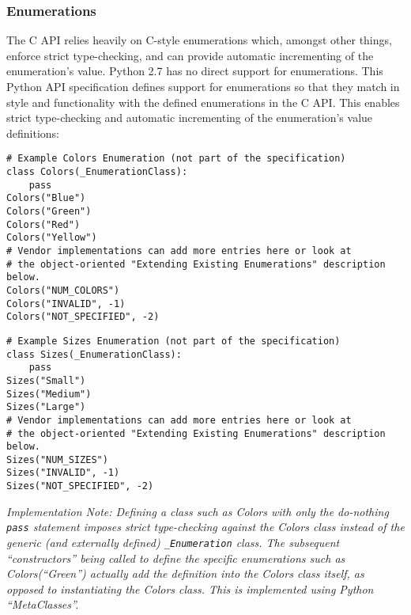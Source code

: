 \subsubsection{Enumerations}\label{sec:Enumerations}

The C API relies heavily on C-style enumerations which, amongst other things,
enforce strict type-checking, and can provide automatic incrementing of the
enumeration's value. Python 2.7 has no direct support for enumerations.  This
Python API specification defines support for enumerations so that they match in
style and functionality with the defined enumerations in the C API. This
enables strict type-checking and automatic incrementing of the enumeration's
value definitions:

\begin{center}\begin{minipage}{.95\linewidth}\begin{lstlisting}
# Example Colors Enumeration (not part of the specification)
class Colors(_EnumerationClass):
    pass
Colors("Blue")
Colors("Green")
Colors("Red")
Colors("Yellow")
# Vendor implementations can add more entries here or look at
# the object-oriented "Extending Existing Enumerations" description below.
Colors("NUM_COLORS")
Colors("INVALID", -1)
Colors("NOT_SPECIFIED", -2)
\end{lstlisting}\end{minipage}\end{center}

\begin{center}\begin{minipage}{.95\linewidth}\begin{lstlisting}
# Example Sizes Enumeration (not part of the specification)
class Sizes(_EnumerationClass):
    pass
Sizes("Small")
Sizes("Medium")
Sizes("Large")
# Vendor implementations can add more entries here or look at
# the object-oriented "Extending Existing Enumerations" description below.
Sizes("NUM_SIZES")
Sizes("INVALID", -1)
Sizes("NOT_SPECIFIED", -2)
\end{lstlisting}\end{minipage}\end{center}

\emph{Implementation Note: Defining a class such as Colors with only the
do-nothing \texttt{pass} statement imposes strict type-checking against the
Colors class instead of the generic (and externally defined) \texttt{_Enumeration}
class. The subsequent ``constructors'' being called to define the specific
enumerations such as Colors(``Green'') actually add the definition into
the Colors class itself, as opposed to instantiating the Colors
class. This is implemented using Python ``MetaClasses''.}

